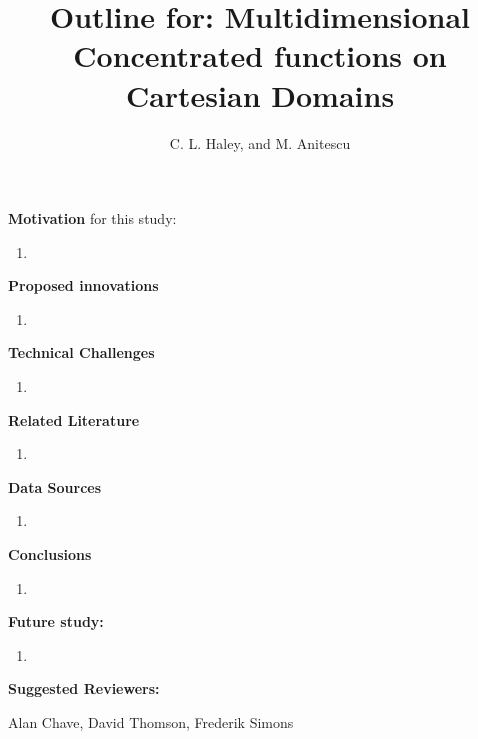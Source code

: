 \documentclass{article}
\title{Outline for: Multidimensional Concentrated functions on Cartesian Domains}
\author{C. L. Haley, and M. Anitescu}
\begin{document}
\maketitle

\textbf{Motivation} for this study:

\begin{enumerate}
  
  \item 

\end{enumerate}

\textbf{Proposed innovations}

\begin{enumerate}

  \item 

\end{enumerate}

\textbf{Technical Challenges}

\begin{enumerate}

  \item 

\end{enumerate}

\textbf{Related Literature}

\begin{enumerate}

  \item 

\end{enumerate}

\textbf{Data Sources}

\begin{enumerate}

  \item 

\end{enumerate}

\textbf{Conclusions}

\begin{enumerate}

  \item 

\end{enumerate}


\textbf{Future study:} 

\begin{enumerate} 

  \item 

\end{enumerate}

\textbf{Suggested Reviewers:}

Alan Chave, David Thomson, Frederik Simons 



\end{document}

